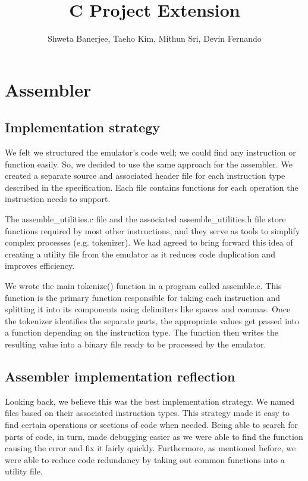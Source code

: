 \documentclass[11pt]{article}
\begin{document}
\title{C Project Extension}
\author{Shweta Banerjee, Taeho Kim, Mithun Sri, Devin Fernando}

\maketitle

\section{Assembler}
\subsection{Implementation strategy}
We felt we structured the emulator's code well; we could find any instruction or function easily. So, we decided to use the same approach for the assembler. We created a separate source and associated header file for each instruction type described in the specification. Each file contains functions for each operation the instruction needs to support. 

The assemble\_utilities.c file and the associated assemble\_utilities.h file store functions required by most other instructions, and they serve as tools to simplify complex processes (e.g. tokenizer). We had agreed to bring forward this idea of creating a utility file from the emulator as it reduces code duplication and improves efficiency. 

We wrote the main tokenize() function in a program called assemble.c. This function is the primary function responsible for taking each instruction and splitting it into its components using delimiters like spaces and commas. Once the tokenizer identifies the separate parts, the appropriate values get passed into a function depending on the instruction type. The function then writes the resulting value into a binary file ready to be processed by the emulator. 

\subsection{Assembler implementation reflection}
Looking back, we believe this was the best implementation strategy. We named files based on their associated instruction types. This strategy made it easy to find certain operations or sections of code when needed. Being able to search for parts of code, in turn, made debugging easier as we were able to find the function causing the error and fix it fairly quickly. Furthermore, as mentioned before, we were able to reduce code redundancy by taking out common functions into a utility file.
\end{document}

